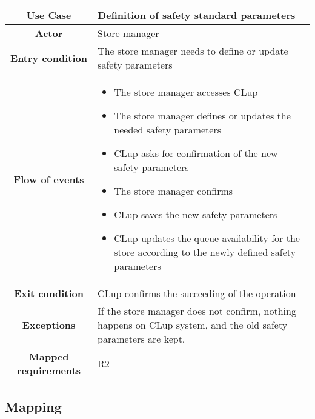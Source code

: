 \documentclass[../../main.tex]{subfiles}
\begin{document}
      \begin{table}[H]
        \centering
          \begin{tabular}{c m{}}
          \hline
          \textbf{Use Case} & Definition of safety standard parameters\\ \hline
          \textbf{Actor} & Store manager\\ \hline
          \textbf{Entry condition} & The store manager needs to define or update safety parameters \\  \hline
          \textbf{Flow of events} & \begin{itemize}
                                      \item The store manager accesses CLup
                                      \item The store manager defines or updates the needed safety parameters
                                      \item CLup asks for confirmation of the new safety parameters
                                      \item The store manager confirms
                                      \item CLup saves the new safety parameters
                                      \item CLup updates the queue availability for the store according to the newly defined safety parameters
                                    \end{itemize}\\ \hline
          \textbf{Exit condition} & CLup confirms the succeeding of the operation \\ \hline
          \textbf{Exceptions} & If the store manager does not confirm, nothing happens on CLup system, and the old safety parameters are kept.\\ \hline
          \textbf{Mapped requirements} & R2\\ \hline
          \end{tabular}
      \end{table}


    \subsection{Mapping}
    
\end{document}
